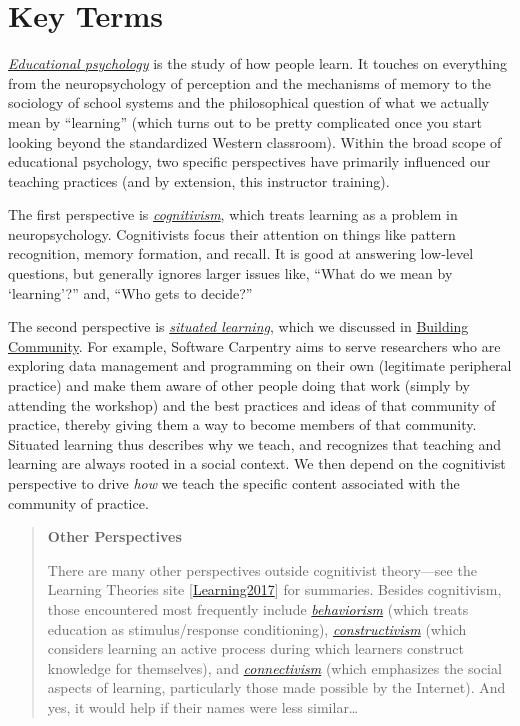 \documentclass[10pt,statementpaper]{memoir}
\begin{document}
\section{Key Terms}\label{key-terms}

\emph{\href{gloss.html\#educational-psychology}{Educational psychology}}
is the study of how people learn. It touches on everything from the
neuropsychology of perception and the mechanisms of memory to the
sociology of school systems and the philosophical question of what we
actually mean by ``learning'' (which turns out to be pretty complicated
once you start looking beyond the standardized Western classroom).
Within the broad scope of educational psychology, two specific
perspectives have primarily influenced our teaching practices (and by
extension, this instructor training).

The first perspective is
\emph{\href{gloss.html\#cognitivism}{cognitivism}}, which treats
learning as a problem in neuropsychology. Cognitivists focus their
attention on things like pattern recognition, memory formation, and
recall. It is good at answering low-level questions, but generally
ignores larger issues like, ``What do we mean by `learning'?'' and,
``Who gets to decide?''

The second perspective is
\emph{\href{gloss.html\#situated-learning}{situated learning}}, which we
discussed in \href{community.html}{Building Community}. For example,
Software Carpentry aims to serve researchers who are exploring data
management and programming on their own (legitimate peripheral practice)
and make them aware of other people doing that work (simply by attending
the workshop) and the best practices and ideas of that community of
practice, thereby giving them a way to become members of that community.
Situated learning thus describes why we teach, and recognizes that
teaching and learning are always rooted in a social context. We then
depend on the cognitivist perspective to drive \emph{how} we teach the
specific content associated with the community of practice.

\begin{quote}
\textbf{Other Perspectives}

There are many other perspectives outside cognitivist theory---see the
Learning Theories site
{[}\href{biblio.html\#learning-theories}{Learning2017}{]} for summaries.
Besides cognitivism, those encountered most frequently include
\emph{\href{gloss.html\#behaviorism}{behaviorism}} (which treats
education as stimulus/response conditioning),
\emph{\href{gloss.html\#constructivism}{constructivism}} (which
considers learning an active process during which learners construct
knowledge for themselves), and
\emph{\href{gloss.html\#connectivism}{connectivism}} (which emphasizes
the social aspects of learning, particularly those made possible by the
Internet). And yes, it would help if their names were less
similar\ldots{}
\end{quote}
\end{document}
